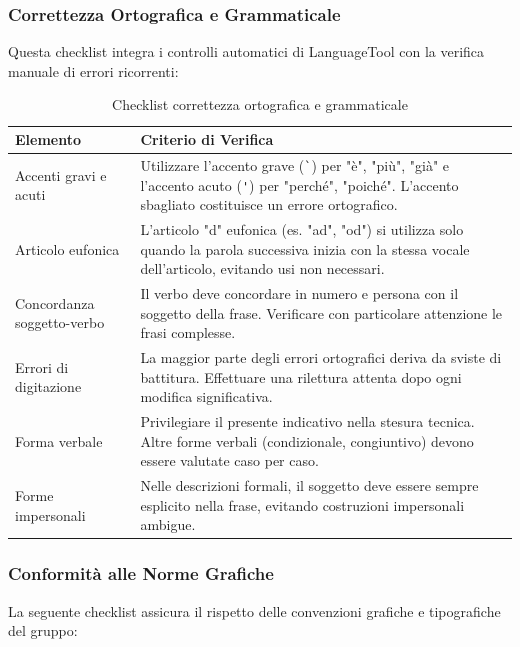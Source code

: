 \documentclass[a4paper,11pt,oneside]{scrartcl}
\begin{document}
\subsubsection{Correttezza Ortografica e Grammaticale}

Questa checklist integra i controlli automatici di LanguageTool con la verifica manuale di errori ricorrenti:

\begin{table}[H]
\centering
\renewcommand{\arraystretch}{1.4}
\begin{tabularx}{\textwidth}{@{}p{}X@{}}
\toprule
\textbf{Elemento} & \textbf{Criterio di Verifica} \\
\midrule
Accenti gravi e acuti & Utilizzare l'accento grave (\texttt{\`{}}) per "è", "più", "già" e l'accento acuto (\texttt{\'{}}) per "perché", "poiché". L'accento sbagliato costituisce un errore ortografico. \\
\midrule
Articolo eufonica & L'articolo "d" eufonica (es. "ad", "od") si utilizza solo quando la parola successiva inizia con la stessa vocale dell'articolo, evitando usi non necessari. \\
\midrule
Concordanza soggetto-verbo & Il verbo deve concordare in numero e persona con il soggetto della frase. Verificare con particolare attenzione le frasi complesse. \\
\midrule
Errori di digitazione & La maggior parte degli errori ortografici deriva da sviste di battitura. Effettuare una rilettura attenta dopo ogni modifica significativa. \\
\midrule
Forma verbale & Privilegiare il presente indicativo nella stesura tecnica. Altre forme verbali (condizionale, congiuntivo) devono essere valutate caso per caso. \\
\midrule
Forme impersonali & Nelle descrizioni formali, il soggetto deve essere sempre esplicito nella frase, evitando costruzioni impersonali ambigue. \\
\bottomrule
\end{tabularx}
\caption{Checklist correttezza ortografica e grammaticale}
\end{table}

\subsubsection{Conformità alle Norme Grafiche}

La seguente checklist assicura il rispetto delle convenzioni grafiche e tipografiche del gruppo:
\end{document}
